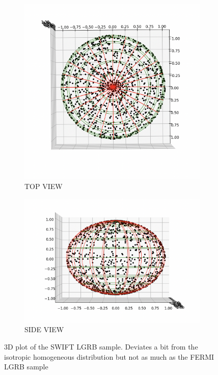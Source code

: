 \documentclass[12pt]{article}
\begin{document}
\begin{figure}[h]
  \begin{subfigure}{.5\textwidth}
  \centering
    \includegraphics[width=1\linewidth]{SWIFT LGRB 3D.png}
    \caption{TOP VIEW}
  \end{subfigure}%
  \begin{subfigure}{.5\textwidth}
  \centering
    \includegraphics[width=1\linewidth]{SWIFT LGRB 3DD.png}
    \caption{SIDE VIEW}
  \end{subfigure}
  \caption{3D plot of the SWIFT LGRB sample. Deviates a bit from the isotropic homogeneous distribution but not as much as the FERMI LGRB sample}
\end{figure}
\end{document}

